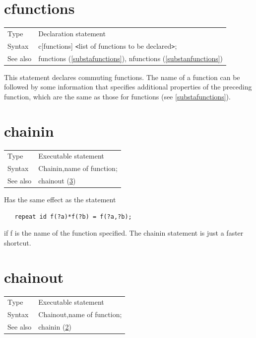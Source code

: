 \section{cfunctions}
\label{substacfunctions}

\noindent \begin{tabular}{ll}
Type & Declaration statement\\
Syntax & c[functions] {\tt<}list of functions to be declared{\tt>}; \\
See also & functions (\ref{substafunctions}), nfunctions (\ref{substanfunctions})
\end{tabular} \vspace{4mm}

\noindent This statement declares commuting 
functions. The name of a 
function can be followed by some information that specifies additional 
properties of the preceding function, which are the same as
those for functions (see \ref{substafunctions}). \vspace{10mm}

 
\section{chainin}
\label{substachainin}

\noindent \begin{tabular}{ll}
Type & Executable statement\\
Syntax & Chainin,name of function;
\\ See also & chainout (\ref{substachainout})
\end{tabular} \vspace{4mm}

\noindent Has the same effect as the statement
\begin{verbatim}
   repeat id f(?a)*f(?b) = f(?a,?b);
\end{verbatim}
if f is the name of the function specified. The chainin statement is just a 
faster shortcut. \vspace{10mm}

 
\section{chainout}
\label{substachainout}

\noindent \begin{tabular}{ll}
Type & Executable statement\\
Syntax & Chainout,name of function;
\\ See also & chainin (\ref{substachainin})
\end{tabular} \vspace{4mm}

